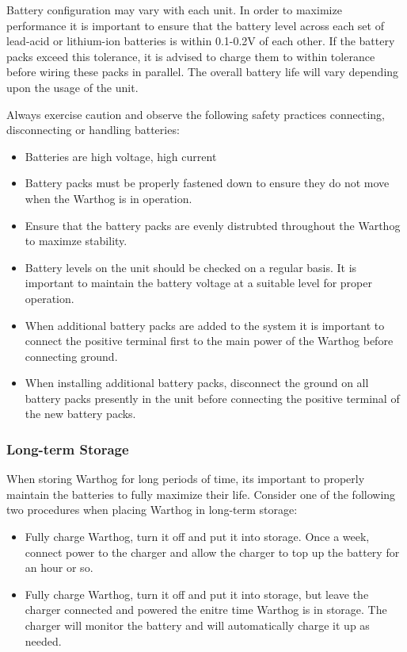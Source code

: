 \documentclass[]{clearpath-latex/clearpath-manual}
\begin{document}
Battery configuration may vary with each unit. In order to maximize performance it is important to ensure that the battery level across each set of lead-acid or lithium-ion batteries is within 0.1-0.2V of each other. If the battery packs exceed this tolerance, it is advised to charge them to within tolerance before wiring these packs
in parallel. The overall battery life will vary depending upon the usage of the unit.

Always exercise caution and observe the following safety practices connecting, disconnecting or handling batteries:

\begin{itemize}[nolistsep]
  \item Batteries are high voltage, high current
  \item Battery packs must be properly fastened down to ensure they do not move when the Warthog is in operation.
  \item Ensure that the battery packs are evenly distrubted throughout the Warthog to maximze stability.
  \item Battery levels on the unit should be checked on a regular basis.  It is important to maintain the battery voltage at a suitable level for proper operation.
  \item When additional battery packs are added to the system it is important to connect the positive terminal first to the main power of the Warthog before connecting ground.
  \item When installing additional battery packs, disconnect the ground on all battery packs presently in the unit before connecting the positive terminal of the new battery packs.
\end{itemize}

\subsubsection{Long-term Storage}

When storing Warthog for long periods of time, its important to properly maintain the batteries to fully maximize their life.  Consider one of the following two procedures when placing Warthog in long-term storage:

\begin{itemize}[nolistsep]
  \item Fully charge Warthog, turn it off and put it into storage.  Once a week, connect power to the charger and allow the charger to top up the battery for an hour or so.
  \item Fully charge Warthog, turn it off and put it into storage, but leave the charger connected and powered the enitre time Warthog is in storage.  The charger will monitor the battery and will automatically charge it up as needed.
\end{itemize}
\end{document}
